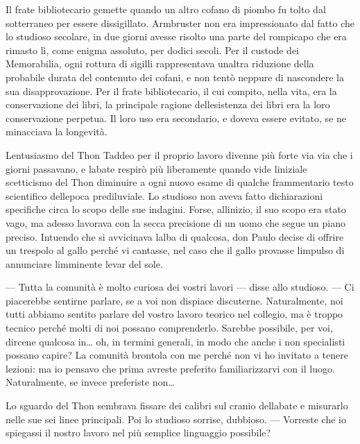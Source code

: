 Il frate bibliotecario gemette quando un altro cofano di piombo fu tolto
dal sotterraneo per essere dissigillato. Armbruster non era
impressionato dal fatto che lo studioso secolare, in due giorni avesse
risolto una parte del rompicapo che era rimasto lì, come enigma
assoluto, per dodici secoli. Per il custode dei Memorabilia, ogni
rottura di sigilli rappresentava un\textquotesingle altra riduzione
della probabile durata del contenuto dei cofani, e non tentò neppure di
nascondere la sua disapprovazione. Per il frate bibliotecario, il cui
compito, nella vita, era la conservazione dei libri, la principale
ragione dell\textquotesingle esistenza dei libri era la loro
conservazione perpetua. Il loro uso era secondario, e doveva essere
evitato, se ne minacciava la longevità.

L\textquotesingle entusiasmo del Thon Taddeo per il proprio lavoro
divenne più forte via via che i giorni passavano, e
l\textquotesingle abate respirò più liberamente quando vide
l\textquotesingle iniziale scetticismo del Thon diminuire a ogni nuovo
esame di qualche frammentario testo scientifico
dell\textquotesingle epoca prediluviale. Lo studioso non aveva fatto
dichiarazioni specifiche circa lo scopo delle sue indagini. Forse,
all\textquotesingle inizio, il suo scopo era stato vago, ma adesso
lavorava con la secca precisione di un uomo che segue un piano preciso.
Intuendo che si avvicinava l\textquotesingle alba di qualcosa, don Paulo
decise di offrire un trespolo al gallo perché vi cantasse, nel caso che
il gallo provasse l\textquotesingle impulso di annunciare
l\textquotesingle imminente levar del sole.

--- Tutta la comunità è molto curiosa dei vostri lavori --- disse allo
studioso. --- Ci piacerebbe sentirne parlare, se a voi non dispiace
discuterne. Naturalmente, noi tutti abbiamo sentito parlare del vostro
lavoro teorico nel collegio, ma è troppo tecnico perché molti di noi
possano comprenderlo. Sarebbe possibile, per voi, dircene qualcosa
in\ldots{} oh, in termini generali, in modo che anche i non specialisti
possano capire? La comunità brontola con me perché non vi ho invitato a
tenere lezioni: ma io pensavo che prima avreste preferito
familiarizzarvi con il luogo. Naturalmente, se invece preferiste
non\ldots{}

Lo sguardo del Thon sembrava fissare dei calibri sul cranio
dell\textquotesingle abate e misurarlo nelle sue sei linee principali.
Poi lo studioso sorrise, dubbioso. --- Vorreste che io spiegassi il
nostro lavoro nel più semplice linguaggio possibile?

